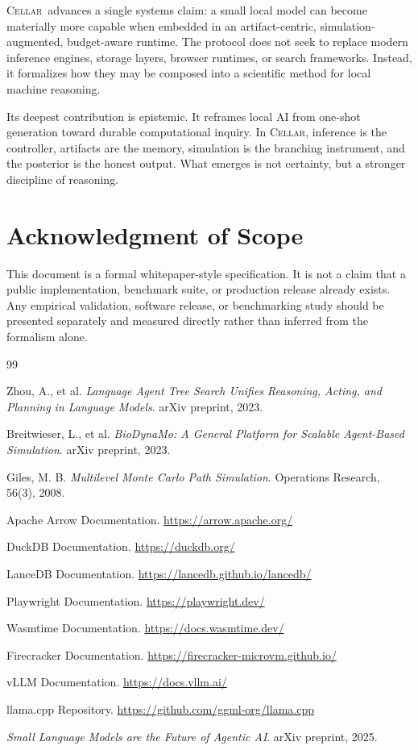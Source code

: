 \documentclass[11pt]{article}
\theoremstyle{definition}
\newcommand{\cellar}{\textsc{Cellar}}
\begin{document}
\cellar\ advances a single systems claim: a small local model can become materially more capable when embedded in an artifact-centric, simulation-augmented, budget-aware runtime. The protocol does not seek to replace modern inference engines, storage layers, browser runtimes, or search frameworks. Instead, it formalizes how they may be composed into a scientific method for local machine reasoning.

Its deepest contribution is epistemic. It reframes local AI from one-shot generation toward durable computational inquiry. In \cellar, inference is the controller, artifacts are the memory, simulation is the branching instrument, and the posterior is the honest output. What emerges is not certainty, but a stronger discipline of reasoning.

\section*{Acknowledgment of Scope}

This document is a formal whitepaper-style specification. It is not a claim that a public implementation, benchmark suite, or production release already exists. Any empirical validation, software release, or benchmarking study should be presented separately and measured directly rather than inferred from the formalism alone.

\begin{thebibliography}{99}

Zhou, A., et al. \emph{Language Agent Tree Search Unifies Reasoning, Acting, and Planning in Language Models}. arXiv preprint, 2023.

Breitwieser, L., et al. \emph{BioDynaMo: A General Platform for Scalable Agent-Based Simulation}. arXiv preprint, 2023.

Giles, M. B. \emph{Multilevel Monte Carlo Path Simulation}. Operations Research, 56(3), 2008.

Apache Arrow Documentation. \url{https://arrow.apache.org/}

DuckDB Documentation. \url{https://duckdb.org/}

LanceDB Documentation. \url{https://lancedb.github.io/lancedb/}

Playwright Documentation. \url{https://playwright.dev/}

Wasmtime Documentation. \url{https://docs.wasmtime.dev/}

Firecracker Documentation. \url{https://firecracker-microvm.github.io/}

vLLM Documentation. \url{https://docs.vllm.ai/}

llama.cpp Repository. \url{https://github.com/ggml-org/llama.cpp}

\emph{Small Language Models are the Future of Agentic AI}. arXiv preprint, 2025.

\end{thebibliography}
\end{document}
